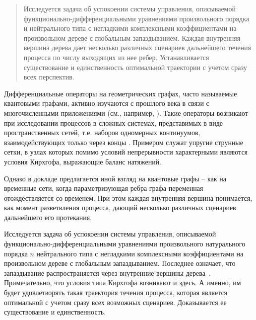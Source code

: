 \maketitle

\begin{abstract}
Исследуется задача об успокоении системы управления, описываемой функ\-цио\-наль\-но-диф\-ференциальными уравнениями произвольного порядка и
нейтрального типа с негладкими комплексными коэффициентами на произвольном дереве с глобальным запаздыванием. Каждая внутренняя вершина
дерева дает несколько различных сценариев дальнейшего течения процесса по числу выходящих из нее ребер. Устанавливается существование и
единственность оптимальной траектории с учетом сразу всех перспектив.

\end{abstract}


Дифференциальные операторы на геометрических графах, часто называемые квантовыми графами, активно изучаются с прошлого века в связи с
многочисленными приложениями (см., например, \cite{Pokornyi,Berkolaiko,Buterin-23}). Такие операторы возникают при исследовании процессов в
сложных системах, представимых в виде пространственных сетей, т.е. наборов одномерных континуумов, взаимодействующих только через концы
\cite{Pokornyi}. Примером служат упругие струнные сетки, в узлах которых помимо условий непрерывности характерными являются условия Кирхгофа,
выражающие баланс натяжений.

Однако в докладе предлагается иной взгляд на квантовые графы -- как на временные сети, когда параметризующая ребра графа переменная
отождествляется со временем. При этом каждая внутренняя вершина понимается, как момент разветвления процесса, дающий несколько различных
сценариев дальнейшего его протекания.

Исследуется задача об успокоении системы управления, описываемой функ\-цио\-наль\-но-диф\-фе\-рен\-циаль\-ны\-ми уравнениями произвольного натурального
порядка $n$ нейтрального типа с не\-глад\-ки\-ми комплексными коэффициентами на произвольном дереве с глобальным запаздыванием. Последнее означает,
что запаздывание распространяется через внутренние вершины дерева~\cite{Buterin-23}. Примечательно, что условия типа Кирхгофа возникают и
здесь. А именно, им будет удовлетворять такая траектория течения процесса, которая является оптимальной с учетом сразу всех возможных
сценариев. Доказывается ее существование и единственность.

